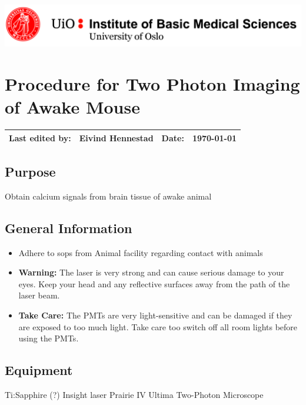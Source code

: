 \newpage

\thispagestyle{ft}

\hfill\includegraphics[width=0.8\linewidth]{imb_logo.png}

\section{Procedure for \textbf{Two Photon Imaging of Awake Mouse}}

\vspace{3mm}
\begin{tabular*}{\linewidth}{| @{\extracolsep{\fill} } llll|}
\hline
Last edited by: & Eivind Hennestad & Date: & \today \\
\hline
\end{tabular*}

\subsection{Purpose}
Obtain calcium signals from brain tissue of awake animal

\subsection{General Information}
\begin{itemize}
\item Adhere to sops from Animal facility regarding contact with animals
\item \textbf{Warning:} The laser is very strong and can cause serious damage to your eyes. Keep your head and any reflective surfaces away from the path of the laser beam.
\item \textbf{Take Care:} The PMTs are very light-sensitive and can be damaged if they are exposed to too much light. Take care too switch off all room lights before using the PMTs.
\end{itemize}

\subsection{Equipment}
Ti:Sapphire (?) Insight laser
Prairie IV Ultima Two-Photon Microscope
